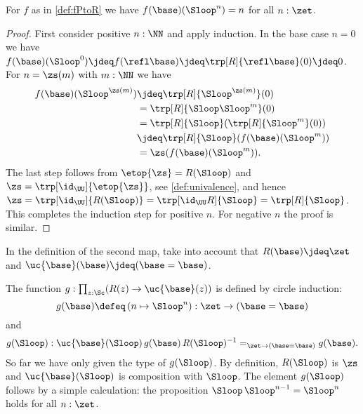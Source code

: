\begin{lemma}\label{lem:windingnumber}
For $f$ as in \cref{def:fPtoR} we have $f(\base)(\Sloop^n)=n$ for all $n:\zet$.
\end{lemma}
\begin{proof}
First consider positive $n:\NN$ and apply induction. In the base case $n=0$ we have
$f(\base)(\Sloop^0)\jdeq f(\refl\base)\jdeq\trp[R]{\refl\base}(0) \jdeq 0$.
For $n=\zs(m)$ with $m:\NN$ we have
\begin{align*}
  f(\base)(\Sloop^{\zs(m)})
  &\jdeq\trp[R]{\Sloop^{\zs(m)}}(0)\\
  &=\trp[R]{\Sloop \Sloop^{m}}(0)\\
  &=\trp[R]{\Sloop}(\trp[R]{\Sloop^m}(0))\\
  &\jdeq \trp[R]{\Sloop}(f(\base)(\Sloop^{m}))\\
  &= \zs(f(\base)(\Sloop^{m})).
\end{align*}
The last step follows from $\etop{\zs}=R(\Sloop)$
and $\zs=\trp[\id_\UU]{\etop{\zs}}$, see \cref{def:univalence},
and hence $\zs=\trp[\id_\UU]{R(\Sloop)}=\trp[\id_\UU R]{\Sloop}=\trp[R]{\Sloop}$.
This completes the induction step for positive $n$.
For negative $n$ the proof is similar.
\end{proof}

In the definition of the second map,
take into account that $R(\base)\jdeq \zet$ and $\uc{\base}(\base) \jdeq (\base=\base)$.

\begin{definition}\label{def:gRtoP}
The function $g:\prod_{z:\Sc}(R(z)\to \uc{\base}(z))$ is
defined by circle induction:
\[
g(\base)\defeq \left(n \mapsto {\Sloop^n} \right) :\zet\to(\base=\base)
\]
and
\[
g(\Sloop): \uc{\base}(\Sloop)\, g(\base)\,R(\Sloop)^{-1}=_{\zet\to (\base=\base)} g(\base).
\]
%
So far we have only given the type of $g(\Sloop)$. By definition,
$R(\Sloop)$ is $\zs$ and $\uc{\base}(\Sloop)$ is composition with
$\Sloop$.
The element $g(\Sloop)$ follows by a simple calculation: the
proposition ${\Sloop\,\Sloop^{n-1}} = {\Sloop^n}$ holds for all
$n:\zet$.
\end{definition}


